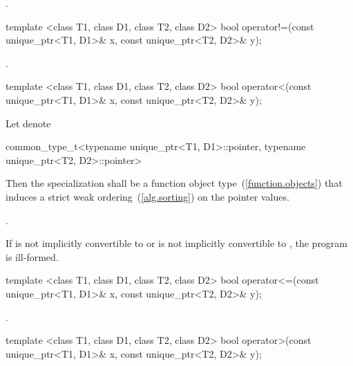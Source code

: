 \begin{itemdescr}
\pnum
\returns {}.
\end{itemdescr}

%
\begin{itemdecl}
template <class T1, class D1, class T2, class D2>
  bool operator!=(const unique_ptr<T1, D1>& x, const unique_ptr<T2, D2>& y);
\end{itemdecl}

\begin{itemdescr}
\pnum
\returns {}.
\end{itemdescr}

%
\begin{itemdecl}
template <class T1, class D1, class T2, class D2>
  bool operator<(const unique_ptr<T1, D1>& x, const unique_ptr<T2, D2>& y);
\end{itemdecl}

\begin{itemdescr}
\pnum
\requires Let  denote
\begin{codeblock}
common_type_t<typename unique_ptr<T1, D1>::pointer,
              typename unique_ptr<T2, D2>::pointer>
\end{codeblock}
Then the specialization
 shall be a function object type~(\ref{function.objects}) that
induces a strict weak ordering~(\ref{alg.sorting}) on the pointer values.

\pnum
\returns {}.

\pnum
\remarks If  is not implicitly convertible
to  or  is not implicitly
convertible to , the program is ill-formed.
\end{itemdescr}

%
\begin{itemdecl}
template <class T1, class D1, class T2, class D2>
  bool operator<=(const unique_ptr<T1, D1>& x, const unique_ptr<T2, D2>& y);
\end{itemdecl}

\begin{itemdescr}
\pnum
\returns {}.
\end{itemdescr}

%
\begin{itemdecl}
template <class T1, class D1, class T2, class D2>
  bool operator>(const unique_ptr<T1, D1>& x, const unique_ptr<T2, D2>& y);
\end{itemdecl}

